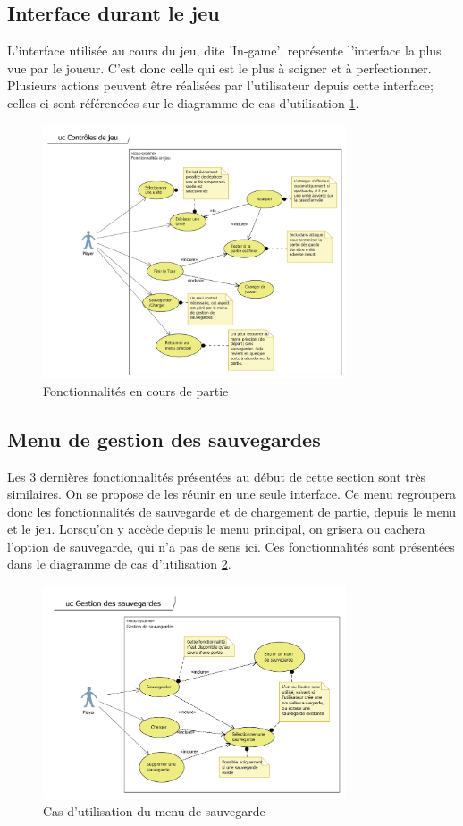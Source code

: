 \subsection{Interface durant le jeu}
L'interface utilisée au cours du jeu, dite 'In-game', représente l'interface la plus vue par le joueur. C'est donc celle qui est le plus à soigner et à perfectionner.
Plusieurs actions peuvent être réalisées par l'utilisateur depuis cette interface; celles-ci sont référencées sur le diagramme de cas d'utilisation \ref{fig:useCaseGame}.
\begin{figure}[h!]
    \centering
    \includegraphics[width=0.8\textwidth]{res/ControleJeu.png}
    \caption{Fonctionnalités en cours de partie}
    \label{fig:useCaseGame}
\end{figure}

\subsection{Menu de gestion des sauvegardes}
Les 3 dernières fonctionnalités présentées au début de cette section sont très similaires. 
On se propose de les réunir en une seule interface.
Ce menu regroupera donc les fonctionnalités de sauvegarde et de chargement de partie, depuis le menu et le jeu. 
Lorsqu'on y accède depuis le menu principal, on grisera ou cachera l'option de sauvegarde, qui n'a pas de sens ici.
Ces fonctionnalités sont présentées dans le diagramme de cas d'utilisation \ref{fig:useCaseSaveMenu}.
\begin{figure}[h!]
    \centering
    \includegraphics[width=0.8\textwidth]{res/SauvegardeMenu.png}
    \caption{Cas d'utilisation du menu de sauvegarde}
    \label{fig:useCaseSaveMenu}
\end{figure}
